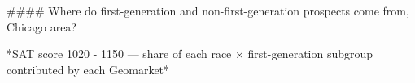 #### Where do first-generation and non-first-generation prospects come from, Chicago area?

*SAT score 1020 - 1150 — share of each race × first-generation subgroup contributed by each Geomarket*
